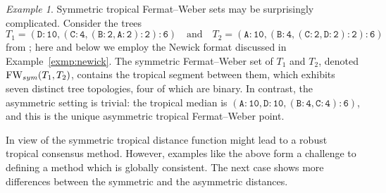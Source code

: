 \documentclass[a4paper,12pt]{amsart}
\DeclareMathOperator{\FW}{FW} %
\newcommand{\FWsym}{\FW_{\rm sym}} %
\theoremstyle{remark}
\newtheorem{example}[theorem]{Example}
\begin{document}
\begin{table}
  \caption{Timings (in seconds) for computing symmetric tropical Fermat--Weber sets of equidistant trees. The computations up to 8 leaves are averages over 10 iterations, whereas those for 9 and 10 leaves are results after one iteration}
  \label{table:sym-times}
  \centering
\end{table}

\begin{example}
  Symmetric tropical Fermat--Weber sets may be surprisingly complicated.
  Consider the trees
  \begin{equation}\label{eq:two-trees}
    T_1 = \mathtt{(D:10,(C:4,(B:2,A:2):2):6)} \quad\text{and}\quad T_2 = \mathtt{(A:10,(B:4,(C:2,D:2):2):6)}
  \end{equation}
  from \cite[Fig.~5]{Lin+Monod+Yoshida:2022}; here and below we employ the Newick format discussed in Example~\ref{exmp:newick}.
  The symmetric Fermat--Weber set of $T_1$ and $T_2$, denoted $\FWsym(T_1,T_2)$, contains the tropical segment between them, which exhibits seven distinct tree topologies, four of which are binary.
  In contrast, the asymmetric setting is trivial: the tropical median is $\mathtt{(A:10,D:10,(B:4,C:4):6)}$, and this is the unique asymmetric tropical Fermat--Weber point.
\end{example}
In view of \cite[Lemma~3.5]{Page+Yoshida+Zhang:2020} the symmetric tropical distance function might lead to a robust tropical consensus method.
However, examples like the above form a challenge to defining a method which is globally consistent.
The next case shows more differences between the symmetric and the asymmetric distances.
\end{document}
